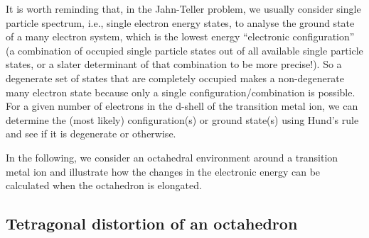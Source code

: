 \documentclass[a4paper,prb,twocolumn]{revtex4-1}  %
\newcommand{\com}[1]{}
\begin{document}
\com{
The dependence of the elastic energy on the distortion can be roughly explained
as follows.
Consider a 
hypothetical 
distortion of an octahedron 
along two of its axes, say, by $a\delta_1,a\delta_2$,
where $a$ is the lattice constant of the cubic structure.
The corresponding change in the unit cell volume would be linear in $\delta_{1,2}$
as $\sim a^3\left(\delta_1+\delta_1\right)$
so the elastic energy %
changes as $\sim\left(\delta_1+\delta_1\right)^2$.
A linear change ($\propto \delta_{1/2}$) in the electronic spectrum is required to produce
 a finite distortion in the optimum structure (or the ground state of full electron-lattice/nuclear problem).
}

It is worth reminding that, in the Jahn-Teller problem,
we usually consider single particle spectrum, i.e.,
single electron energy states,
to analyse the ground state of a many electron system,
which is the lowest energy ``electronic configuration'' 
(a combination of occupied single particle states 
out of all available single particle states, 
or a slater determinant of that combination to be more precise!).
So a degenerate set of states that are completely occupied
makes a non-degenerate many electron state because 
only a single configuration/combination is possible.
For a given number of electrons in the d-shell of the transition metal ion,
we can determine the (most likely) configuration(s) or ground state(s)
using Hund's rule and see if it is degenerate or otherwise.
  



\com{
Instability:\\
 Low/high spin configurations, rules/arguments using single particle spectrum and a given low/high spin state with a given number of electrons:\\
elastic energy vs electronic... number of electrons... multi-electron configurations.... degenerate vs non-degenerate cases...
}






In the following, we 
consider an octahedral environment around a transition metal ion 
and 
illustrate how the changes in the electronic energy 
can be calculated
 when the octahedron is elongated.











\subsection{Tetragonal distortion of an octahedron}
\label{sec:JTtertagonal}
\end{document}
